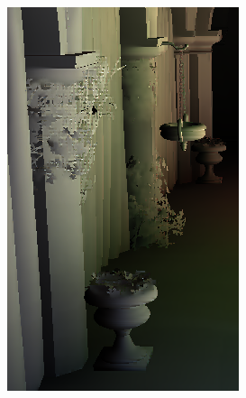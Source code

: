\begin{figure}[htb]
\begin{subfigure}[b]{0.20\textwidth}
        \includegraphics[width=.95\textwidth]{screenshots/interleaved_final}
        \caption{}
        \label{fig:results:interleaved_final}
    \end{subfigure}%
    \begin{subfigure}[b]{0.20\textwidth}
        \centering

\end{subfigure}
\end{figure}
